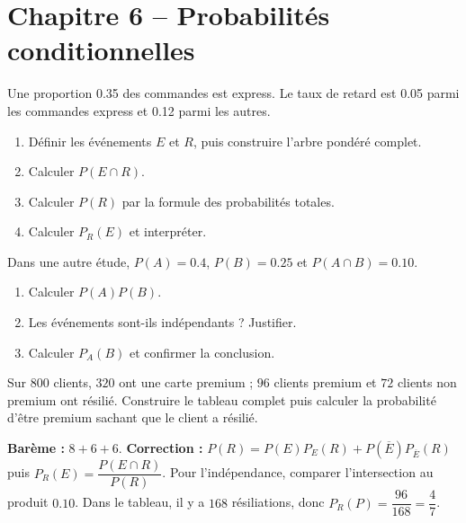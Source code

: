 \section*{Chapitre 6 -- Probabilités conditionnelles}
\begin{exercise}
Une proportion \num{0,35} des commandes est express. Le taux de retard est \num{0,05} parmi les commandes express et \num{0,12} parmi les autres.
\begin{enumerate}
\item Définir les événements $E$ et $R$, puis construire l'arbre pondéré complet.
\item Calculer $P(E\cap R)$.
\item Calculer $P(R)$ par la formule des probabilités totales.
\item Calculer $P_R(E)$ et interpréter.
\end{enumerate}
\end{exercise}
\begin{exercise}[2 -- Indépendance]
Dans une autre étude, $P(A)=\num{0,4}$, $P(B)=\num{0,25}$ et $P(A\cap B)=\num{0,10}$.
\begin{enumerate}
\item Calculer $P(A)P(B)$.
\item Les événements sont-ils indépendants ? Justifier.
\item Calculer $P_A(B)$ et confirmer la conclusion.
\end{enumerate}
\end{exercise}
\begin{exercise}
Sur $800$ clients, $320$ ont une carte premium ; $96$ clients premium et $72$ clients non premium ont résilié. Construire le tableau complet puis calculer la probabilité d'être premium sachant que le client a résilié.
\end{exercise}
\begin{solution}\textbf{Barème :} $8+6+6$. \textbf{Correction :} $P(R)=P(E)P_E(R)+P(\overline E)P_{\overline E}(R)$ puis $P_R(E)=\dfrac{P(E\cap R)}{P(R)}$. Pour l'indépendance, comparer l'intersection au produit $\num{0,10}$. Dans le tableau, il y a $168$ résiliations, donc $P_R(P)=\dfrac{96}{168}=\dfrac47$.\end{solution}

